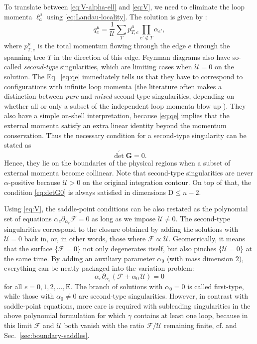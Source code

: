 \documentclass[12pt]{article}
\numberwithin{figure}{section}
\def \be {\begin{equation}}
\def \ee {\end{equation}}
\def \D {\mathrm{D}}
\def \E {\mathrm{E}}
\def \U {\mathcal{U}}
\def \F {\mathcal{F}}
\def \leq {\leqslant}
\begin{document}
    To translate between \eqref{eq:V-alpha-ell} and \eqref{eq:V}, we need to eliminate the loop momenta $\ell_a^\mu$ using \eqref{eq:Landau-locality}. The solution is given by \cite{Mizera:2021fap}:
    \be\label{eq:qe}
    q_e^\mu = \frac{1}{\U} \sum_T p_{T,e}^{\mu} \prod_{e' \notin T} \alpha_{e'},
    \ee
    where $p_{T,e}^\mu$ is the total momentum flowing through the edge $e$ through the spanning tree $T$ in the direction of this edge. Feynman diagrams also have so-called \emph{second-type} singularities, which are limiting cases when $\U=0$ on the solution. The Eq.~\eqref{eq:qe} immediately tells us that they have to correspond to configurations with infinite loop momenta (the literature often makes a distinction between \emph{pure} and \emph{mixed} second-type singularities, depending on whether all or only a subset of the independent loop momenta blow up \cite{Cutkosky:1960sp,doi:10.1063/1.1724262,Drummond1963}).
    They also have a simple on-shell interpretation, because \eqref{eq:qe} implies that the external momenta satisfy an extra linear identity beyond the momentum conservation. Thus the necessary condition for a second-type singularity can be stated as
    \be\label{eq:detG0}
    {\det}^\prime \mathbf{G} = 0.
    \ee
    Hence, they lie on the boundaries of the physical regions when a subset of external momenta become collinear.
    Note that second-type singularities are never $\alpha$-positive because $\U > 0$ on the original integration contour. On top of that, the condition  \eqref{eq:detG0} is always satisfied in dimensions $\D \leq n{-}2$.
    
    Using \eqref{eq:V}, the saddle-point conditions can be also restated as the polynomial set of equations $\alpha_e \partial_{\alpha_e} \F = 0$ as long as we impose $\U \neq 0$. The second-type singularities correspond to the closure obtained by adding the solutions with $\U = 0$ back in, or, in other words, those where $\F \propto \U$. Geometrically, it means that the surface $\{ \F = 0 \}$ not only degenerates itself, but also pinches $\{ \U = 0 \}$ at the same time. By adding an auxiliary parameter $\alpha_0$ (with mass dimension $2$), everything can be neatly packaged into the variation problem:
    \be\label{eq:FU-vary}
    \alpha_e \partial_{\alpha_e} (\F + \alpha_0\, \U) = 0
    \ee
    for all $e = 0,1,2,\ldots,\E$. The branch of solutions with $\alpha_0 = 0$ is called first-type, while those with $\alpha_0 \neq 0$ are second-type singularities. However, in contrast with saddle-point equations, more care is required with subleading singularities in the above polynomial formulation for which $\gamma$ contains at least one loop, because in this limit $\F$ and $\U$ both vanish with the ratio $\F/\U$ remaining finite, cf. \cite{Mizera:2021icv} and Sec.~\ref{sec:boundary-saddles}.
    
\end{document}
